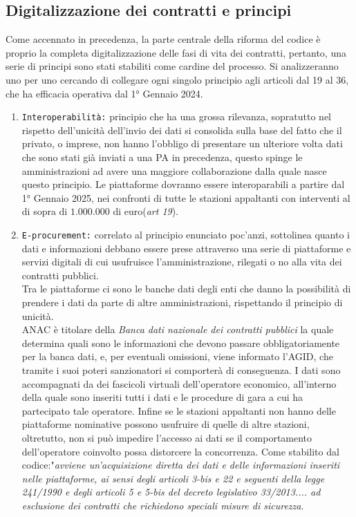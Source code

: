 \documentclass{article}
\begin{document}
\newpage\subsection{Digitalizzazione dei contratti e principi}
\begin{justify}
    Come accennato in precedenza, la parte centrale della riforma del codice è proprio la completa digitalizzazione delle fasi di vita dei contratti, pertanto, una serie di principi sono stati stabiliti come cardine del processo.
    Si analizzeranno uno per uno cercando di collegare ogni singolo principio agli articoli dal 19 al 36, che ha efficacia operativa dal 1° Gennaio 2024.\\
    \begin{enumerate}
        \item \texttt{Interoperabilità:} principio che ha una grossa rilevanza, sopratutto nel rispetto dell'unicità dell'invio dei dati si consolida sulla base del fatto che il privato, o imprese, non hanno l'obbligo di presentare un ulteriore volta dati che sono stati già inviati a una PA in precedenza, questo spinge le amministrazioni ad avere una maggiore collaborazione dalla quale nasce questo principio. Le piattaforme dovranno essere interoparabili a partire dal 1° Gennaio 2025, nei confronti di tutte le stazioni appaltanti con interventi al di sopra di $1.000.000$ di euro(\textit{art 19}).
        \item \texttt{E-procurement:} correlato al principio enunciato poc'anzi, sottolinea quanto i dati e informazioni debbano essere prese attraverso una serie di piattaforme e servizi digitali di cui usufruisce l'amministrazione, rilegati o no alla vita dei contratti pubblici.\\ Tra le piattaforme ci sono le banche dati degli enti che danno la possibilità di prendere i dati da parte di altre amministrazioni, rispettando il principio di unicità.\\
        ANAC è titolare della \textit{Banca dati nazionale dei contratti pubblici} la quale determina quali sono le informazioni che devono passare obbligatoriamente per la banca dati, e, per eventuali omissioni, viene informato l'AGID, che tramite i suoi poteri sanzionatori si comporterà di conseguenza. I dati sono accompagnati da dei fascicoli virtuali dell'operatore economico, all'interno della quale sono inseriti tutti i dati e le procedure di gara a cui ha partecipato tale operatore. Infine se le stazioni appaltanti non hanno delle piattaforme nominative possono usufruire di quelle di altre stazioni, oltretutto, non si può impedire l'accesso ai dati se il comportamento dell'operatore coinvolto possa distorcere la concorrenza. Come stabilito dal codice:"\textit{avviene un'acquisizione diretta dei dati e delle informazioni inseriti nelle piattaforme, ai sensi degli articoli 3-bis e 22 e seguenti della legge 241/1990 e degli articoli 5 e 5-bis del decreto legislativo 33/2013.... ad esclusione dei contratti che richiedono speciali misure di sicurezza}.\\

\end{enumerate}
\end{justify}
\end{document}
